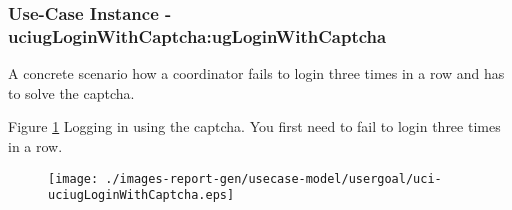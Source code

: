 
	\subsubsection{Use-Case Instance - uciugLoginWithCaptcha:ugLoginWithCaptcha}
	
	A concrete scenario how a coordinator fails to login three times in a row and has to solve the captcha.		  
	\begin{operationmodel}
	
	\end{operationmodel} 

	
	Figure \ref{fig:lu.uni.lassy.excalibur.MyCrash.G02-RE-UC-uci-uciugLoginWithCaptcha}
	Logging in using the captcha. You first need to fail to login three times in a row.
	
	\begin{figure}[htbp]
	\begin{center}
	
	\texttt{[image: ./images-report-gen/usecase-model/usergoal/uci-uciugLoginWithCaptcha.eps]}
	\end{center}
	\caption[lu.uni.lassy.excalibur.MyCrash.G02 Sequence Diagram: uci-uciugLoginWithCaptcha]{}
	\label{fig:lu.uni.lassy.excalibur.MyCrash.G02-RE-UC-uci-uciugLoginWithCaptcha}
	\end{figure}
	\vspace{0.5cm}
